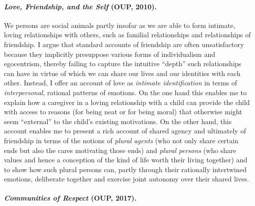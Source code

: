 \documentclass[11pt]{article}
\begin{document}
\paragraph{\emph{Love, Friendship, and the Self} (OUP, 2010).}

We persons are social animals partly insofar as we are able to form intimate, loving relationships with others, such as familial relationships and relationships of friendship. I argue that standard accounts of friendship are often unsatisfactory because they implicitly presuppose various forms of individualism and egocentrism, thereby failing to capture the intuitive \enquote{depth} such relationships can have in virtue of which we can share our lives and our identities with each other. Instead, I offer an account of love as \emph{intimate identification} in terms of \emph{interpersonal}, rational patterns of emotions. On the one hand this enables me to explain how a caregiver in a loving relationship with a child can provide the child with access to reasons (for being neat or for being moral) that otherwise might seem \enquote{external} to the child's existing motivations. On the other hand, this account enables me to present a rich account of shared agency and ultimately of friendship in terms of the notions of \emph{plural agents} (who not only share certain ends but also the cares motivating those ends) and \emph{plural persons} (who share values and hence a conception of the kind of life worth their living together) and to show how such plural persons can, partly through their rationally intertwined emotions, deliberate together and exercise joint autonomy over their shared lives.

\paragraph{\emph{Communities of Respect} (OUP, 2017).}
\end{document}
